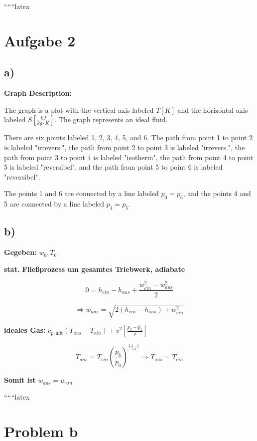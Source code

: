 
``````latex


\section*{Aufgabe 2}

\subsection*{a)}

\begin{center}
\textbf{Graph Description:}
\end{center}

The graph is a plot with the vertical axis labeled \( T \left[ K \right] \) and the horizontal axis labeled \( S \left[ \frac{kJ}{kg \cdot K} \right] \). The graph represents an ideal fluid. 

There are six points labeled 1, 2, 3, 4, 5, and 6. The path from point 1 to point 2 is labeled "irrevers.", the path from point 2 to point 3 is labeled "irrevers.", the path from point 3 to point 4 is labeled "isotherm", the path from point 4 to point 5 is labeled "reversibel", and the path from point 5 to point 6 is labeled "reversibel". 

The points 1 and 6 are connected by a line labeled \( p_0 = p_6 \), and the points 4 and 5 are connected by a line labeled \( p_4 = p_5 \).

\subsection*{b)}

\textbf{Gegeben:} \( w_6, T_6 \)

\textbf{stat. Fließprozess um gesamtes Triebwerk, adiabate}

\[
0 = h_{ein} - h_{aus} + \frac{w_{ein}^2 - w_{aus}^2}{2}
\]

\[
\Rightarrow w_{aus} = \sqrt{2(h_{ein} - h_{aus}) + w_{ein}^2}
\]

\textbf{ideales Gas:} \( c_{p, \text{mit}} (T_{aus} - T_{ein}) + v^2 \left[ \frac{p_3 - p_1}{\rho} \right] \)

\[
T_{aus} = T_{ein} \left( \frac{p_6}{p_0} \right)^{\frac{1.4 - 1}{1.4}} \Rightarrow T_{aus} = T_{ein}
\]

\textbf{Somit ist} \( w_{aus} = w_{ein} \)

``````latex


\section*{Problem b}

